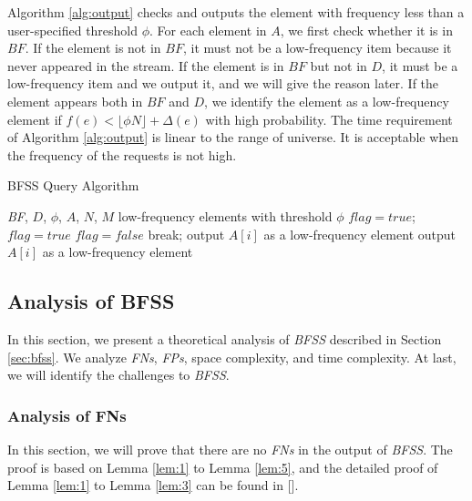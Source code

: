 \documentclass[conference]{IEEEtran}
\begin{document}
Algorithm \ref{alg:output} checks and outputs the element with frequency less than a user-specified threshold $\phi$. For each element in $A$, we first check whether it is in $BF$. If the element is not in $BF$, it must not be a low-frequency item because it never appeared in the stream. If the element is in $BF$ but not in $D$, it must be a low-frequency item and we output it, and we will give the reason later. If the element appears both in $BF$ and $D$, we identify the element as a low-frequency element if $f(e)<\lfloor \phi N\rfloor+\Delta(e)$ with high probability. The time requirement of Algorithm \ref{alg:output} is linear to the range of universe. It is acceptable when the frequency of the requests is not high. 

\begin{algorithm}[h]
	\caption{BFSS Query Algorithm}
	\label{alg:output}
	\begin{algorithmic}[1]
		\REQUIRE \emph{BF}, $D$, $\phi$, $A$, $N$, $M$
		\ENSURE low-frequency elements with threshold $\phi$
		\STATE $flag=true$; 
		\STATE $flag=true$
		\STATE $flag=false$
		\STATE break;
		\ENDIF
		\ENDFOR
		\STATE output $A[i]$ as a low-frequency element
		\ENDIF
		\ELSE
		\STATE output $A[i]$ as a low-frequency element
		\ENDIF
		\ENDIF
		\ENDFOR
	\end{algorithmic}
\end{algorithm}
\subsection{Analysis of BFSS}
In this section, we present a theoretical analysis of \emph{BFSS} described in Section \ref{sec:bfss}. We analyze \emph{FNs}, \emph{FPs}, space complexity, and time complexity. At last, we will identify the challenges to \emph{BFSS}. \par


\subsubsection{\textbf{Analysis of FNs}}
In this section, we will prove that there are no \emph{FNs} in the output of \emph{BFSS}. The proof is based on Lemma \ref{lem:1} to Lemma \ref{lem:5}, and the detailed proof of Lemma \ref{lem:1} to Lemma \ref{lem:3} can be found in [].\par
\end{document}
